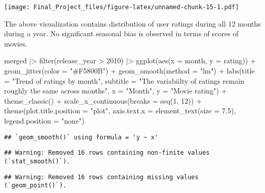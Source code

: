\documentclass[
]{article}
\newenvironment{Shaded}{\begin{snugshade}}{\end{snugshade}}
\newcommand{\AttributeTok}[1]{\textcolor[rgb]{0.77,0.63,0.00}{#1}}
\newcommand{\DecValTok}[1]{\textcolor[rgb]{0.00,0.00,0.81}{#1}}
\newcommand{\FloatTok}[1]{\textcolor[rgb]{0.00,0.00,0.81}{#1}}
\newcommand{\FunctionTok}[1]{\textcolor[rgb]{0.00,0.00,0.00}{#1}}
\newcommand{\NormalTok}[1]{#1}
\newcommand{\SpecialCharTok}[1]{\textcolor[rgb]{0.00,0.00,0.00}{#1}}
\newcommand{\StringTok}[1]{\textcolor[rgb]{0.31,0.60,0.02}{#1}}
\begin{document}
\texttt{[image: Final\_Project\_files/figure-latex/unnamed-chunk-15-1.pdf]}

The above visualization contains distribution of user ratings during all
12 months during a year. No significant seasonal bias is observed in
terms of scores of movies.

\begin{Shaded}
\begin{Highlighting}[]
\NormalTok{merged }\SpecialCharTok{|\textgreater{}}
  \FunctionTok{filter}\NormalTok{(release\_year }\SpecialCharTok{\textgreater{}} \DecValTok{2010}\NormalTok{) }\SpecialCharTok{|\textgreater{}}
  \FunctionTok{ggplot}\NormalTok{(}\FunctionTok{aes}\NormalTok{(}\AttributeTok{x =}\NormalTok{ month, }\AttributeTok{y =}\NormalTok{ rating)) }\SpecialCharTok{+}
  \FunctionTok{geom\_jitter}\NormalTok{(}\AttributeTok{color =} \StringTok{"\#F5800B"}\NormalTok{) }\SpecialCharTok{+}
  \FunctionTok{geom\_smooth}\NormalTok{(}\AttributeTok{method =} \StringTok{"lm"}\NormalTok{) }\SpecialCharTok{+}
  \FunctionTok{labs}\NormalTok{(}\AttributeTok{title =} \StringTok{"Trend of ratings by month"}\NormalTok{,}
       \AttributeTok{subtitle =} \StringTok{"The variabiilty of ratings remain roughly the same across months"}\NormalTok{,}
       \AttributeTok{x =} \StringTok{"Month"}\NormalTok{,}
       \AttributeTok{y =} \StringTok{"Movie rating"}\NormalTok{) }\SpecialCharTok{+}
  \FunctionTok{theme\_classic}\NormalTok{() }\SpecialCharTok{+}
  \FunctionTok{scale\_x\_continuous}\NormalTok{(}\AttributeTok{breaks =} \FunctionTok{seq}\NormalTok{(}\DecValTok{1}\NormalTok{, }\DecValTok{12}\NormalTok{)) }\SpecialCharTok{+}
  \FunctionTok{theme}\NormalTok{(}\AttributeTok{plot.title.position =} \StringTok{"plot"}\NormalTok{,}
        \AttributeTok{axis.text.x =} \FunctionTok{element\_text}\NormalTok{(}\AttributeTok{size =} \FloatTok{7.5}\NormalTok{),}
        \AttributeTok{legend.position =} \StringTok{"none"}\NormalTok{)}
\end{Highlighting}
\end{Shaded}

\begin{verbatim}
## `geom_smooth()` using formula = 'y ~ x'
\end{verbatim}

\begin{verbatim}
## Warning: Removed 16 rows containing non-finite values (`stat_smooth()`).
\end{verbatim}

\begin{verbatim}
## Warning: Removed 16 rows containing missing values (`geom_point()`).
\end{verbatim}
\end{document}
